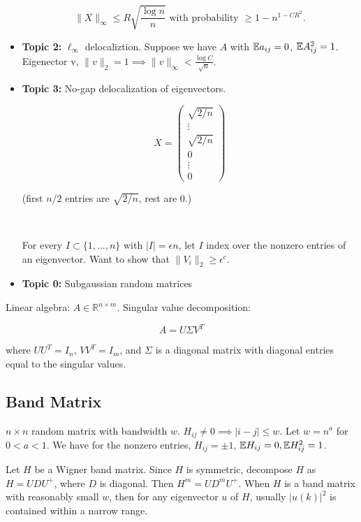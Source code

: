 \begin{itemize}
\[
\lVert X \rVert_\infty \leq R \sqrt{\frac{\log n}{n}} \text{ with probability } \geq 1 - n^{1 - CR^2}.
\]

\item \textbf{Topic 2:} \(\ell_\infty\) delocaliztion. Suppose we have \(A\) with \(\mathbb{E} a_{ij} = 0\), \(\mathbb{E} A_{ij}^2 = 1\). Eigenector v, \(\lVert v \rVert_2 = 1 \implies \lVert v \rVert_\infty < \frac{\log C}{\sqrt{n}}\). 

\item \textbf{Topic 3:} No-gap delocalization of eigenvectors. 

\[
X = \begin{pmatrix} \sqrt{2/n} \\ \vdots \\ \sqrt{2/n} \\ 0 \\ \vdots \\ 0 \end{pmatrix}
\]

(first \(n/2\) entries are \(\sqrt{2/n}\), rest are 0.)

\

For every \(I \subset \{1, \ldots, n\}\) with \(|I| = \epsilon n\), let \(I\) index over the nonzero entries of an eigenvector. Want to show that \(\lVert V_i \rVert_2 \geq \epsilon^c\). 

\item \textbf{Topic 0:} Subgaussian random matrices

\end{itemize}

Linear algebra: \(A \in \mathbb{R}^{n \times m}\). Singular value decomposition:

\[
A = U \Sigma V^T
\]

where \(U U^T = I_n\), \(V V^T = I_m\), and \(\Sigma \) is a diagonal matrix with diagonal entries equal to the singular values. 

\subsection{Band Matrix}

\(n \times n\) random matrix with bandwidth \(w\). \(H_{ij} \neq 0 \implies | i - j| \leq w\). Let \(w = n^a\) for \(0 < a < 1\). We have for the nonzero entries, \(H_{ij} = \pm 1\), \(\mathbb{E} H_{ij} = 0, \mathbb{E} H_{ij}^2 = 1\).

Let \(H\) be a Wigner band matrix. Since \(H\) is symmetric, decompose \(H\) as \(H = UDU^+\), where \(D\) is diagonal. Then \(H^m = U D^m U^+\). When \(H\) is a band matrix with reasonably small \(w\), then for any eigenvector \(u\) of \(H\), usually \(|u(k)|^2\) is contained within a narrow range.


